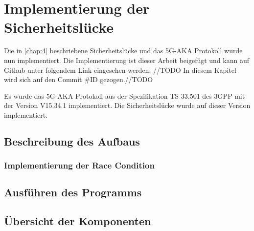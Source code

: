 \chapter{Implementierung der Sicherheitsl\"ucke}
\label{chap:5}

Die in \cref{chap:4} beschriebene Sicherheitslücke und das 5G-AKA Protokoll wurde nun implementiert.
Die Implementierung ist dieser Arbeit beigefügt und kann auf Github unter folgendem Link eingesehen werden: \url{}//TODO
In diesem Kapitel wird sich auf den Commit \#ID gezogen.//TODO

Es wurde das 5G-AKA Protokoll aus der Spezifikation TS 33.501 des 3GPP mit der Version V15.34.1 implementiert.
Die Sicherheitslücke wurde auf dieser Version implementiert.

\section{Beschreibung des Aufbaus}


\subsection{Implementierung der Race Condition}


\section{Ausführen des Programms}


\section{Übersicht der Komponenten}
